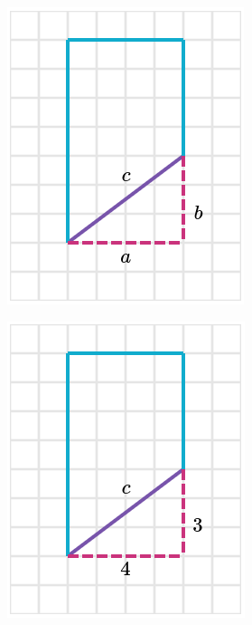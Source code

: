 \begin{solutionbox}{16cm}
\begin{minipage}{0.4\textwidth}
\begin{multicols}{2}
\begin{figure}[H]
                \includegraphics[width=0.9\linewidth]{../images/peri_trap_02b.png}
                \caption{}
                \label{fig:peri_trap_02b}
            \end{figure}
        \end{multicols}
        \begin{multicols}{2}
            \begin{figure}[H]
                \centering
                \includegraphics[width=0.9\linewidth]{../images/peri_trap_02c.png}

\end{figure}
\end{multicols}
\end{minipage}
\end{solutionbox}
